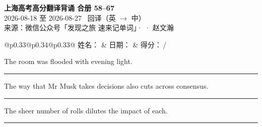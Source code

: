 \documentclass[11pt,a4paper]{article}
\newcommand{\num}[1]{\makebox[1.9em][r]{#1.}\hspace{0.3em}}
\newcommand{\wline}{\noindent\rule{\linewidth}{0.4pt}}
\begin{document}
\pagestyle{plain}
\begin{center}
{\LARGE\bfseries 上海高考高分翻译背诵 \quad 合册 58–67}\\[0.25em]
{\large 2026-08-18 至 2026-08-27 \quad\ 回译（英 $\to$ 中）}\\[0.35em]
{\footnotesize 来源：微信公众号「发现之旅 速来记单词」·  · 赵文瀚}
\end{center}

\vspace{0.4em}
\noindent\begin{tabular}{@{}p{0.33\textwidth}@{}p{0.34\textwidth}@{}p{0.33\textwidth}@{}}
姓名：\underline{\hspace{2.0cm}} & 日期：\underline{\hspace{2.0cm}} & 得分：\underline{\hspace{1.4cm}}\,/ \\
\end{tabular}

\vspace{0.5em}

\vspace{0.8em}
\vspace{0.35em}\vspace{0.15em}

\begin{minipage}{\linewidth}

\num{1}The room was flooded with evening light.

\vspace{0.25em}

\wline

\end{minipage}

\begin{minipage}{\linewidth}

\num{2}The way that Mr Musk takes decisions also cuts across consensus.

\vspace{0.25em}

\wline

\end{minipage}

\begin{minipage}{\linewidth}

\num{3}The sheer number of rolls dilutes the impact of each.

\vspace{0.25em}

\wline

\end{minipage}
\end{document}
